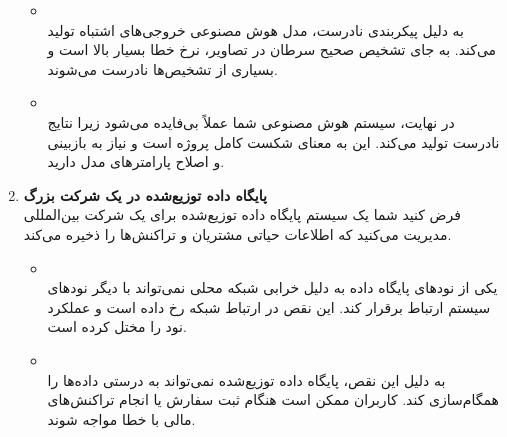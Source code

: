 \begin{qsolve}[]
\begin{enumerate}
\begin{itemize}
			\item {}\\
			به دلیل پیکربندی نادرست، مدل هوش مصنوعی خروجی‌های اشتباه تولید می‌کند. به جای تشخیص صحیح سرطان در تصاویر، نرخ خطا بسیار بالا است و بسیاری از تشخیص‌ها نادرست می‌شوند.
			
			\item {}\\
			در نهایت، سیستم هوش مصنوعی شما عملاً بی‌فایده می‌شود زیرا نتایج نادرست تولید می‌کند. این به معنای شکست کامل پروژه است و نیاز به بازبینی و اصلاح پارامترهای مدل دارید.
		\end{itemize}
		
		
		\item 
		\textbf{پایگاه داده توزیع‌شده  در یک شرکت بزرگ}\\
		فرض کنید شما یک سیستم پایگاه داده توزیع‌شده برای یک شرکت بین‌المللی مدیریت می‌کنید که اطلاعات حیاتی مشتریان و تراکنش‌ها را ذخیره می‌کند.
		
		\begin{itemize}
			\item {}\\
			یکی از نودهای پایگاه داده به دلیل خرابی شبکه محلی نمی‌تواند با دیگر نودهای سیستم ارتباط برقرار کند. این نقص در ارتباط شبکه رخ داده است و عملکرد نود را مختل کرده است.
			
			\item {}\\
			به دلیل این نقص، پایگاه داده توزیع‌شده نمی‌تواند به درستی داده‌ها را همگام‌سازی کند. کاربران ممکن است هنگام ثبت سفارش یا انجام تراکنش‌های مالی با خطا مواجه شوند.			

		\end{itemize}
	\end{enumerate}
\end{qsolve}





